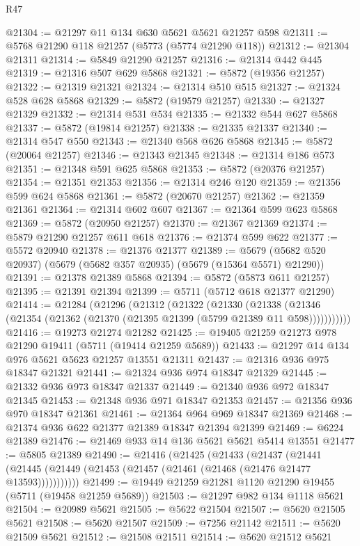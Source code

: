\begin{lexlean}{R47}
\begin{coremodule}
@21304 := @21297 @11 @134 @630 @5621 @5621 @21257 @598
@21311 := @5768 @21290 @118 @21257 (@5773 (@5774 @21290 @118))
@21312 := @21304 @21311
@21314 := @5849 @21290 @21257
@21316 := @21314 @442 @445
@21319 := @21316 @507 @629 @5868
@21321 := @5872 (@19356 @21257)
@21322 := @21319 @21321
@21324 := @21314 @510 @515
@21327 := @21324 @528 @628 @5868
@21329 := @5872 (@19579 @21257)
@21330 := @21327 @21329
@21332 := @21314 @531 @534
@21335 := @21332 @544 @627 @5868
@21337 := @5872 (@19814 @21257)
@21338 := @21335 @21337
@21340 := @21314 @547 @550
@21343 := @21340 @568 @626 @5868
@21345 := @5872 (@20064 @21257)
@21346 := @21343 @21345
@21348 := @21314 @186 @573
@21351 := @21348 @591 @625 @5868
@21353 := @5872 (@20376 @21257)
@21354 := @21351 @21353
@21356 := @21314 @246 @120
@21359 := @21356 @599 @624 @5868
@21361 := @5872 (@20670 @21257)
@21362 := @21359 @21361
@21364 := @21314 @602 @607
@21367 := @21364 @599 @623 @5868
@21369 := @5872 (@20950 @21257)
@21370 := @21367 @21369
@21374 := @5879 @21290 @21257 @611 @618
@21376 := @21374 @599 @622
@21377 := @5572 @20940
@21378 := @21376 @21377
@21389 := @5679 (@5682 @520 @20937) (@5679 (@5682 @357 @20935) (@5679 (@15364 @5571) @21290))
@21391 := @21378 @21389 @5868
@21394 := @5872 (@5873 @611 @21257)
@21395 := @21391 @21394
@21399 := @5711 (@5712 @618 @21377 @21290)
@21414 := @21284
    (@21296
      (@21312
        (@21322
          (@21330
            (@21338 (@21346 (@21354 (@21362 (@21370 (@21395 @21399 (@5799 @21389 @11 @598)))))))))))
@21416 := @19273 @21274 @21282
@21425 := @19405 @21259 @21273 @978 @21290 @19411 (@5711 (@19414 @21259 @5689))
@21433 := @21297 @14 @134 @976 @5621 @5623 @21257 @13551 @21311
@21437 := @21316 @936 @975 @18347 @21321
@21441 := @21324 @936 @974 @18347 @21329
@21445 := @21332 @936 @973 @18347 @21337
@21449 := @21340 @936 @972 @18347 @21345
@21453 := @21348 @936 @971 @18347 @21353
@21457 := @21356 @936 @970 @18347 @21361
@21461 := @21364 @964 @969 @18347 @21369
@21468 := @21374 @936 @622 @21377 @21389 @18347 @21394 @21399
@21469 := @6224 @21389
@21476 := @21469 @933 @14 @136 @5621 @5621 @5414 @13551
@21477 := @5805 @21389
@21490 := @21416
    (@21425
      (@21433
        (@21437
          (@21441 (@21445 (@21449 (@21453 (@21457 (@21461 (@21468 (@21476 @21477 @13593)))))))))))
@21499 := @19449 @21259 @21281 @1120 @21290 @19455 (@5711 (@19458 @21259 @5689))
@21503 := @21297 @982 @134 @1118 @5621
@21504 := @20989 @5621
@21505 := @5622 @21504
@21507 := @5620 @21505 @5621
@21508 := @5620 @21507
@21509 := @7256 @21142
@21511 := @5620 @21509 @5621
@21512 := @21508 @21511
@21514 := @5620 @21512 @5621

\end{coremodule}
\end{lexlean}
